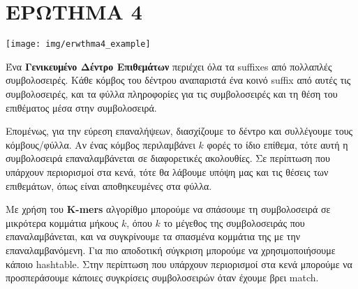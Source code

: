 \chapter{ΕΡΩΤΗΜΑ 4}
    \vspace{-10pt}
    \begin{center} \noindent
        \texttt{[image: img/erwthma4\_example]}
    \end{center}

    Ένα \textbf{Γενικευμένο Δέντρο Επιθεμάτων} περιέχει όλα τα suffixes από πολλαπλές συμβολοσειρές.
    Κάθε κόμβος του δέντρου αναπαριστά ένα κοινό suffix από αυτές τις συμβολοσειρές, και τα φύλλα πληροφορίες για τις συμβολοσειρές και τη θέση του επιθέματος μέσα στην συμβολοσειρά.

    Επομένως, για την εύρεση επαναλήψεων, διασχίζουμε το δέντρο και συλλέγουμε τους κόμβους/φύλλα.
    Αν ένας κόμβος περιλαμβάνει \(k\) φορές το ίδιο επίθεμα, τότε αυτή η συμβολοσειρά επαναλαμβάνεται σε διαφορετικές ακολουθίες.
    Σε περίπτωση που υπάρχουν περιορισμοί στα κενά, τότε θα λάβουμε υπόψη μας και τις θέσεις των επιθεμάτων, όπως είναι αποθηκευμένες στα φύλλα.


    Με χρήση του \textbf{K-mers} αλγορίθμο μπορούμε να σπάσουμε τη συμβολοσειρά σε μικρότερα κομμάτια μήκους \(k\), όπου \(k\) το μέγεθος της συμβολοσειράς που επαναλαμβάνεται, και να συγκρίνουμε τα σπασμένα κομμάτια της με την επαναλαμβανόμενη.
    Για πιο αποδοτική σύγκριση μπορούμε να χρησιμοποιήσουμε κάποιο hashtable.
    Στην περίπτωση που υπάρχουν περιορισμοί στα κενά μπορούμε να προσπεράσουμε κάποιες συγκρίσεις συμβολοσειρών όταν έχουμε βρει match.


%
%

